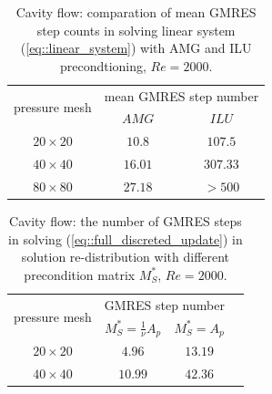 \documentclass{eajam}
\begin{document}
       
       \begin{table}[!htbp]
         \centering
         \begin{tabular}{ccc}
           \toprule
           \multirow{2}{*}{pressure mesh}  & \multicolumn{2}{c}{mean GMRES step number} \\
           \cline{2-3}
                           & $AMG$ & $ILU$ \\ \midrule
           $20 \times 20$   &      $10.8$           &     $107.5$
           \\ \midrule
           $40 \times 40$   &      $16.01$             &     $307.33$
           \\ \midrule       
           $80 \times 80$   &     $27.18$              &     $>500$
           \\ \bottomrule 
         \end{tabular}
         \caption{Cavity flow: comparation of mean GMRES step counts in solving linear system
           (\ref{eq::linear_system}) with AMG and ILU precondtioning, $Re = 2000$.}
         \label{tab::comparation_GMRES_steps}
       \end{table}

       \begin{table}[!htbp]
         \centering
         \begin{tabular}{cccc}
           \toprule
           \multirow{2}{*}{pressure mesh}   & \multicolumn{2}{c}{GMRES step number} \\
           \cline{2-3}
                           & $M_S^* = \frac{1}{\nu}A_p $& $M_S^* = A_p$ \\ \midrule
           $20 \times 20$  &      $4.96$           &     $13.19$
           \\ \midrule
           $40 \times 40$  &      $10.99$           &     $42.36$
           \\ \bottomrule 
         \end{tabular}
         \caption{Cavity flow: the number of GMRES steps in solving
           (\ref{eq::full_discreted_update}) 
           in solution re-distribution with different precondition
           matrix $M_S^*$, $Re = 2000$.}
         \label{tab::GMRES_steps_initial}
       \end{table}
\end{document}
